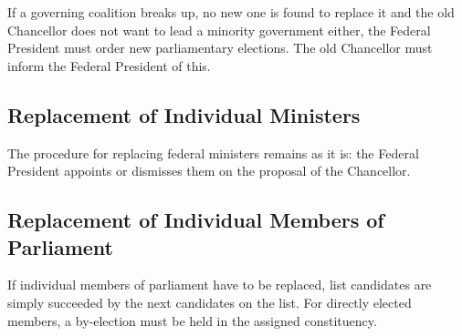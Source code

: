 If a governing coalition breaks up, no new one is found to replace it and the old Chancellor does not want to lead a minority government
either, the Federal President must order new parliamentary elections.
The old Chancellor must inform the Federal President of this.

\subsection{Replacement of Individual Ministers}
The procedure for replacing federal ministers remains as it is: the Federal President appoints or dismisses them on the proposal of the Chancellor.

\subsection{Replacement of Individual Members of Parliament} \label{subsec:replacement_of_individual_mps}
If individual members of parliament have to be replaced, list candidates are simply succeeded by the next candidates on the list.
For directly elected members, a by-election must be held in the assigned constituency.
